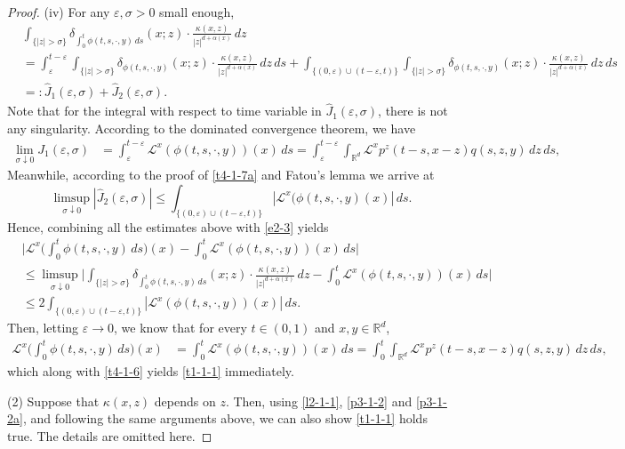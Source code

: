 \documentclass[a4paper,11pt]{amsart}
\renewcommand{\le}{\leqslant}
\newcommand{\R}{\mathds R}
\newcommand{\K}{\kappa}
\newcommand{\A}{\alpha}
\newcommand{\e}{ \varepsilon}
\def\LL{{\mathcal L}}
\def\wh{\widehat}
\theoremstyle{definition}
\begin{document}
\begin{proof}
{(iv)} For any $\e,\sigma>0$ small enough,
\begin{align*}
&\int_{\{|z|>\sigma\}}\delta_{\int_0^t\phi(t,s,\cdot,y)\,ds}(x;z)\cdot\frac{\K(x,z)}{|z|^{d+\A(x)}}\,dz\\
&=\int_{\e}^{t-\e} \int_{\{|z|>\sigma\}}\delta_{\phi(t,s,\cdot,y)}(x;z)\cdot\frac{\K(x,z)}{|z|^{d+\A(x)}}\,dz
\,ds +\int_{\{(0,\e)\cup(t-\e,t)\}}
\int_{\{|z|>\sigma\}}\delta_{\phi(t,s,\cdot,y)}(x;z)\cdot\frac{\K(x,z)}{|z|^{d+\A(x)}}\,dz
\,ds\\
&=:\wh J_1(\e,\sigma)+\wh J_2(\e,\sigma).
\end{align*}
Note that for the integral with respect to time variable in $\wh J_1(\e,\sigma)$, there is not any
singularity. According to the dominated convergence theorem,  we have
\begin{align*}
\lim_{\sigma \downarrow 0}J_1(\e,\sigma)&=\int_{\e}^{t-\e}
 \LL^x(\phi(t,s,\cdot,y))(x)\,ds=\int_{\e}^{t-\e}\int_{\R^d} \LL^x p^z(t-s,x-z)q(s,z,y)\,dz\,ds,
\end{align*}
Meanwhile, according to the proof of \eqref{t4-1-7a} and Fatou's lemma we arrive at
\begin{equation*}
\limsup_{\sigma \downarrow 0}|\wh J_2(\e,\sigma)|\le
\int_{\{(0,\e)\cup(t-\e,t)\}}| \LL^x(\phi(t,s,\cdot,y)(x)|\,ds.
\end{equation*}
Hence, combining all the estimates above with \eqref{e2-3} yields
\begin{align*}
&\Big| \LL^x\Big(\int_0^t \phi(t,s,\cdot,y)\,ds\Big)(x)-
\int_0^t  \LL^x(\phi(t,s,\cdot,y))(x)\,ds\Big|\\
&\le \limsup_{\sigma \downarrow 0}\bigg|\int_{\{|z|>\sigma\}}\delta_{\int_0^t\phi(t,s,\cdot,y)\,ds}(x;z)\cdot\frac{\K(x,z)}{|z|^{d+\A(x)}}\,dz
-\int_0^t  \LL^x(\phi(t,s,\cdot,y))(x)\,ds \bigg|\\
&\le 2\int_{\{(0,\e)\cup(t-\e,t)\}}| \LL^x(\phi(t,s,\cdot,y))(x)|\,ds.
\end{align*}
Then, letting $\e \rightarrow 0$, we know that for every $t \in (0,1)$ and $x,y\in \R^d$,
\begin{align*}
 \LL^x\Big(\int_0^t \phi(t,s,\cdot,y)\,ds\Big)(x)
&=\int_0^t  \LL^x(\phi(t,s,\cdot,y))(x)\,ds=
\int_0^t\int_{\R^d} \LL^x p^z(t-s,x-z)q(s,z,y)\,dz\,ds,
\end{align*}
which along with \eqref{t4-1-6} yields \eqref{t1-1-1} immediately.

{(2)} Suppose that $\K(x,z)$ depends on $z$. Then, using \eqref{l2-1-1},
\eqref{p3-1-2} and \eqref{p3-1-2a}, and following the same arguments above,
we can also show \eqref{t1-1-1} holds true. The details are omitted here.
\end{proof}
\end{document}
